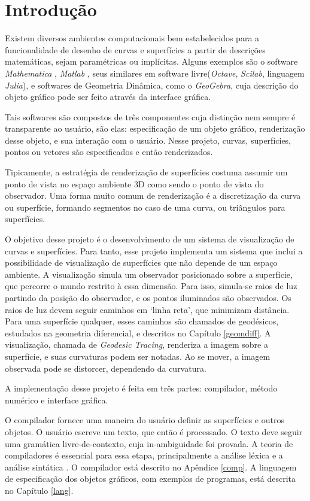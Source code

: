 \chapter{Introdução}
Existem diversos ambientes computacionais
bem estabelecidos para a funcionalidade de desenho de curvas e
superfícies a partir de descrições matemáticas, sejam paramétricas
ou implícitas. Alguns exemplos são o software \textit{Mathematica} \cite{mathematica},
\textit{Matlab} \cite{matlab}, seus similares em software livre(\textit{Octave}, \textit{Scilab},
linguagem \textit{Julia}), e softwares de Geometria Dinâmica, como o \textit{GeoGebra},
cuja descrição do objeto gráfico pode ser feito através da interface gráfica.

Tais softwares são compostos de três componentes cuja distinção nem sempre
é transparente ao usuário, são elas: especificação de um objeto gráfico,
renderização desse objeto, e sua interação com o usuário.
Nesse projeto, curvas, superfícies, pontos ou vetores são especificados
e então renderizados.

Tipicamente, a estratégia de renderização
de superfícies costuma assumir um ponto de vista no espaço ambiente 3D
como sendo o ponto de vista do observador.
Uma forma muito comum de renderização é a discretização da curva ou superfície,
formando segmentos no caso de uma curva, ou triângulos para superfícies.

O objetivo desse projeto é o desenvolvimento de um sistema de visualização
de curvas e superfícies. Para tanto, esse projeto implementa um sistema que inclui
a possibilidade de visualização de superfícies que não depende de um espaço ambiente.
A visualização simula um observador posicionado sobre a superfície, que percorre o mundo
restrito à essa dimensão.
Para isso, simula-se raios de luz partindo da posição do observador, e os pontos iluminados são observados.
Os raios de luz devem seguir caminhos em `linha reta', que minimizam distância.
Para uma superfície qualquer, esses caminhos são chamados de geodésicos,
estudados na geometria diferencial, e descritos no Capítulo \ref{geomdiff}.
A visualização, chamada de \textit{Geodesic Tracing}, renderiza a imagem sobre a superfície,
e suas curvaturas podem ser notadas. Ao se mover, a imagem observada pode se distorcer,
dependendo da curvatura.

A implementação desse projeto é feita em três partes:
compilador, método numérico e interface gráfica.

O compilador fornece uma maneira do usuário definir as superfícies e outros objetos.
O usuário escreve um texto, que então é processado.
O texto deve seguir uma gramática livre-de-contexto,
cuja in-ambiguidade foi provada.
A teoria de compiladores é essencial para essa etapa,
principalmente a análise léxica e a análise sintática \cite{Dragon:1}.
O compilador está descrito no Apêndice \ref{comp}.
A linguagem de especificação dos objetos gráficos, com exemplos de programas, está descrita no Capítulo \ref{lang}.

